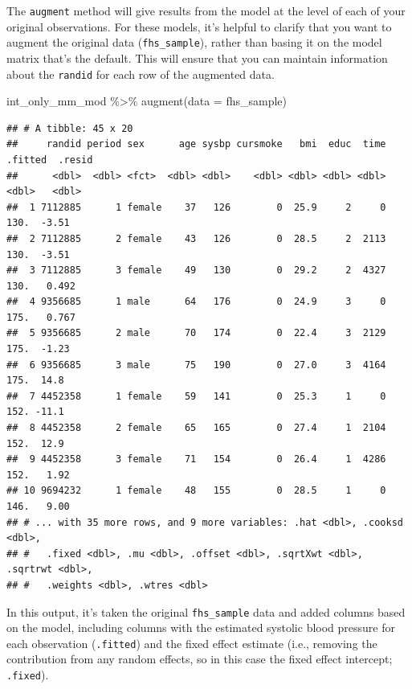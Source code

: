 \documentclass[
]{book}
\newenvironment{Shaded}{\begin{snugshade}}{\end{snugshade}}
\newcommand{\AttributeTok}[1]{\textcolor[rgb]{0.77,0.63,0.00}{#1}}
\newcommand{\FunctionTok}[1]{\textcolor[rgb]{0.00,0.00,0.00}{#1}}
\newcommand{\NormalTok}[1]{#1}
\newcommand{\SpecialCharTok}[1]{\textcolor[rgb]{0.00,0.00,0.00}{#1}}
\begin{document}
The \texttt{augment} method will give results from the model at the level of each of your
original observations. For these models, it's helpful to clarify that you want
to augment the original data (\texttt{fhs\_sample}), rather than basing it on the model
matrix that's the default. This will ensure that you can maintain information about
the \texttt{randid} for each row of the augmented data.

\begin{Shaded}
\begin{Highlighting}[]
\NormalTok{int\_only\_mm\_mod }\SpecialCharTok{\%\textgreater{}\%} 
  \FunctionTok{augment}\NormalTok{(}\AttributeTok{data =}\NormalTok{ fhs\_sample)}
\end{Highlighting}
\end{Shaded}

\begin{verbatim}
## # A tibble: 45 x 20
##     randid period sex      age sysbp cursmoke   bmi  educ  time .fitted  .resid
##      <dbl>  <dbl> <fct>  <dbl> <dbl>    <dbl> <dbl> <dbl> <dbl>   <dbl>   <dbl>
##  1 7112885      1 female    37   126        0  25.9     2     0    130.  -3.51 
##  2 7112885      2 female    43   126        0  28.5     2  2113    130.  -3.51 
##  3 7112885      3 female    49   130        0  29.2     2  4327    130.   0.492
##  4 9356685      1 male      64   176        0  24.9     3     0    175.   0.767
##  5 9356685      2 male      70   174        0  22.4     3  2129    175.  -1.23 
##  6 9356685      3 male      75   190        0  27.0     3  4164    175.  14.8  
##  7 4452358      1 female    59   141        0  25.3     1     0    152. -11.1  
##  8 4452358      2 female    65   165        0  27.4     1  2104    152.  12.9  
##  9 4452358      3 female    71   154        0  26.4     1  4286    152.   1.92 
## 10 9694232      1 female    48   155        0  28.5     1     0    146.   9.00 
## # ... with 35 more rows, and 9 more variables: .hat <dbl>, .cooksd <dbl>,
## #   .fixed <dbl>, .mu <dbl>, .offset <dbl>, .sqrtXwt <dbl>, .sqrtrwt <dbl>,
## #   .weights <dbl>, .wtres <dbl>
\end{verbatim}

In this output, it's taken the original \texttt{fhs\_sample} data and added columns
based on the model, including columns with the estimated systolic blood pressure
for each observation (\texttt{.fitted}) and the fixed effect estimate (i.e., removing
the contribution from any random effects, so in this case the fixed effect
intercept; \texttt{.fixed}).
\end{document}

